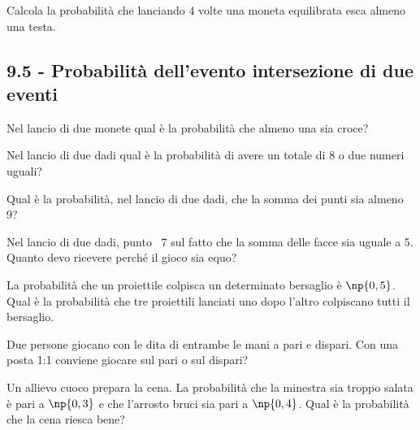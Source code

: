 \begin{esercizio}[\Ast]
 \label{ese:9.45}
Calcola la probabilità che lanciando 4 volte una moneta equilibrata esca almeno una testa.
\end{esercizio}

\subsection*{9.5 - Probabilità dell'evento intersezione di due eventi}

\begin{esercizio}[\Ast]
 \label{ese:9.46}
Nel lancio di due monete qual è la probabilità che almeno una sia croce?
\end{esercizio}

\begin{esercizio}[\Ast]
 \label{ese:9.47}
Nel lancio di due dadi qual è la probabilità di avere un totale di 8 o due numeri uguali?
\end{esercizio}

\begin{esercizio}[\Ast]
 \label{ese:9.48}
Qual è la probabilità, nel lancio di due dadi, che la somma dei punti sia almeno 9?
\end{esercizio}

\begin{esercizio}[\Ast]
 \label{ese:9.49}
Nel lancio di due dadi, punto \officialeuro~$7$ sul fatto che la somma delle facce sia uguale a 5. Quanto devo ricevere perché il gioco sia equo?
\end{esercizio}

\begin{esercizio}[\Ast]
 \label{ese:9.50}
La probabilità che un proiettile colpisca un determinato bersaglio è $\np{0,5}$. Qual è la probabilità che tre proiettili lanciati uno dopo l'altro colpiscano tutti il bersaglio.
\end{esercizio}

\begin{esercizio}[\Ast]
 \label{ese:9.51}
Due persone giocano con le dita di entrambe le mani a pari e dispari. Con una posta 1:1 conviene giocare sul pari o sul dispari?
\end{esercizio}

\begin{esercizio}[\Ast]
 \label{ese:9.52}
Un allievo cuoco prepara la cena. La probabilità che la minestra sia troppo salata è pari a $\np{0,3}$ e che l'arrosto bruci sia pari a $\np{0,4}$. Qual è la probabilità che la cena riesca bene?
\end{esercizio}

